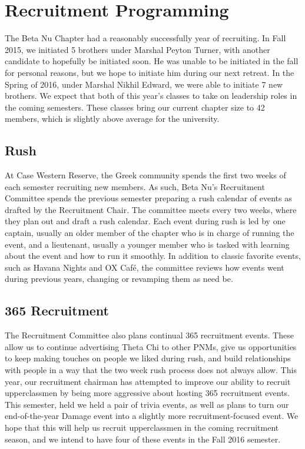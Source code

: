 \chapter{Recruitment Programming}

  The Beta Nu Chapter had a reasonably successfully year of recruiting. In Fall 2015, we initiated 5 brothers under Marshal Peyton Turner, with another candidate to hopefully be initiated soon. He was unable to be initiated in the fall for personal reasons, but we hope to initiate him during our next retreat. In the Spring of 2016, under Marshal Nikhil Edward, we were able to initiate 7 new brothers. We expect that both of this year’s classes to take on leadership roles in the coming semesters. These classes bring our current chapter size to 42 members, which is slightly above average for the university.
    
  \section*{Rush}
    At Case Western Reserve, the Greek community spends the first two weeks of each semester recruiting new members. As such, Beta Nu's Recruitment Committee spends the previous semester preparing a rush calendar of events as drafted by the Recruitment Chair. The committee meets every two weeks, where they plan out and draft a rush calendar. Each event during rush is led by one captain, usually an older member of the chapter who is in charge of running the event, and a lieutenant, usually a younger member who is tasked with learning about the event and how to run it smoothly. In addition to classic favorite events, such as Havana Nights and OX Café, the committee reviews how events went during previous years, changing or revamping them as need be.

  \section*{365 Recruitment}    
    The Recruitment Committee also plans continual 365 recruitment events. These allow us to continue advertising Theta Chi to other PNMs, give us opportunities to keep making touches on people we liked during rush, and build relationships with people in a way that the two week rush process does not always allow. This year, our recruitment chairman has attempted to improve our ability to recruit upperclassmen by being more aggressive about hosting 365 recruitment events. This semester, held we held a pair of trivia events, as well as plans to turn our end-of-the-year Damage event into a slightly more recruitment-focused event. We hope that this will help us recruit upperclassmen in the coming recruitment season, and we intend to have four of these events in the Fall 2016 semester.
    

